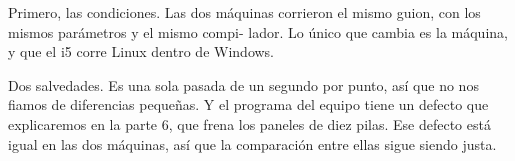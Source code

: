Primero, las condiciones. Las dos máquinas corrieron el mismo guion, con los mismos parámetros y el mismo compi- lador. Lo único que cambia es la máquina, y que el i5 corre Linux dentro de Windows.

Dos salvedades. Es una sola pasada de un segundo por punto, así que no nos fiamos de diferencias pequeñas. Y el programa del equipo tiene un defecto que explicaremos en la parte 6, que frena los paneles de diez pilas. Ese defecto está igual en las dos máquinas, así que la comparación entre ellas sigue siendo justa.
